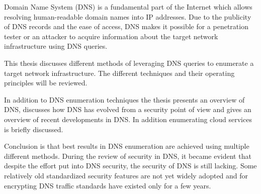 %
%



\begin{enabstract}
Domain Name System (DNS) is a fundamental part of the Internet which allows resolving human-readable domain names into IP addresses. Due to the publicity of DNS records and the ease of access, DNS makes it possible for a penetration tester or an attacker to acquire information about the target network infrastructure using DNS queries.

This thesis discusses different methods of leveraging DNS queries to enumerate a target network infrastructure. 
The different techniques and their operating principles will be reviewed.

In addition to DNS enumeration techniques the thesis presents an overview of DNS, discusses how DNS has evolved from a security point of view and gives an overview of recent developments in DNS. In addition enumerating cloud services is briefly discussed.

Conclusion is that best results in DNS enumeration are achieved using multiple different methods. During the review of security in DNS, it became evident that despite the effort put into DNS security, the security of DNS is still lacking. Some relatively old standardized security features are not yet widely adopted and for encrypting DNS traffic standards have existed only for a few years.
\end{enabstract}
